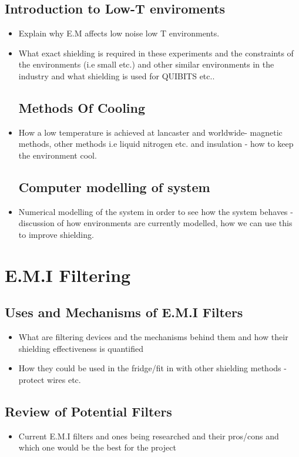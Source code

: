 \documentclass[a4paper,12pt]{article}
\begin{document}
\subsection{Introduction to Low-T enviroments}
\begin{itemize}
\item Explain why E.M affects low noise low T environments. 
\item What exact shielding is required in these experiments and the constraints of the environments (i.e small etc.) and other similar environments in the industry and what shielding is used for QUIBITS etc.. 

\subsection{Methods Of Cooling}
\item How a low temperature is achieved at lancaster and worldwide- magnetic methods, other methods i.e liquid nitrogen etc. and insulation - how to keep the environment cool.
 
\subsection{Computer modelling of system}
\item Numerical modelling of the system in order to see how the system behaves - discussion of how environments are currently modelled, how we can use this to improve shielding. 
\end{itemize}

\section{E.M.I Filtering}
\subsection{Uses and Mechanisms of E.M.I Filters}
\begin{itemize}
\item What are filtering devices and the mechanisms behind them and how their shielding effectiveness is quantified
\item How they could be used in the fridge/fit in with other shielding methods - protect wires etc.
\end{itemize}
\subsection{Review of Potential Filters}
\begin{itemize}
\item Current E.M.I filters and ones being researched and their pros/cons and which one would be the best for the project
\end{itemize}
\end{document}
